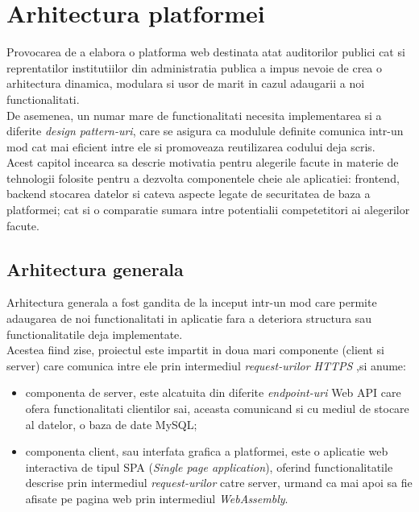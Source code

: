 \chapter{Arhitectura platformei}
 Provocarea de a elabora o platforma web destinata atat auditorilor publici cat si reprentatilor institutiilor din administratia publica  a impus nevoie de crea o arhitectura dinamica, modulara si usor de marit in cazul adaugarii a noi functionalitati.\\
De asemenea, un numar mare de functionalitati necesita implementarea si a diferite \textit{design pattern-uri}, care se asigura ca modulule definite comunica intr-un mod cat mai eficient intre ele si promoveaza reutilizarea codului deja scris.\\
Acest capitol incearca sa descrie motivatia pentru alegerile facute in materie de tehnologii folosite pentru a dezvolta componentele cheie ale aplicatiei: frontend, backend stocarea datelor si cateva aspecte legate de securitatea de baza a platformei; cat si o comparatie sumara intre potentialii competetitori ai alegerilor facute.

\section {Arhitectura generala}
Arhitectura generala a fost gandita de la inceput intr-un mod care permite adaugarea de noi functionalitati in aplicatie fara a deteriora structura sau functionalitatile deja implementate.\\
Acestea fiind zise, proiectul este impartit in doua mari componente (client si server)  care comunica intre ele prin intermediul \textit{request-urilor HTTPS} ,si anume:

\begin{itemize}
	
	\item componenta de server, este alcatuita din diferite \textit{endpoint-uri}  Web API care ofera functionalitati clientilor sai, aceasta comunicand si cu mediul de stocare al datelor, o baza de date MySQL;
	
	\item componenta client, sau interfata grafica a platformei, este o aplicatie web interactiva de tipul SPA (\textit{Single page application}), oferind functionalitatile descrise prin intermediul \textit{request-urilor} catre server, urmand ca mai apoi sa fie afisate pe pagina web prin intermediul \textit{WebAssembly}.
\end{itemize}  

